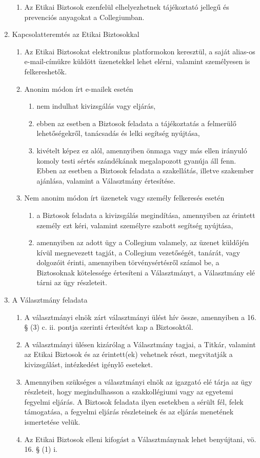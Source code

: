 \documentclass{../styles/rulebook}
\begin{document}
\begin{enumerate}
\begin{enumerate}
		\item Az Etikai Biztosok ezenfelül elhelyezhetnek tájékoztató jellegű és prevenciós anyagokat a Collegiumban.
	\end{enumerate}
	\item Kapcsolatteremtés az Etikai Biztosokkal
	\begin{enumerate}
		\item Az Etikai Biztosokat elektronikus platformokon keresztül, a saját alias-os e-mail-címükre küldött üzenetekkel lehet elérni, valamint személyesen is felkereshetők.
		\item Anonim módon írt e-mailek esetén
		\begin{enumerate}
			\item nem indulhat kivizsgálás vagy eljárás,
			\item ebben az esetben a Biztosok feladata a tájékoztatás a felmerülő lehetőségekről, tanácsadás és lelki segítség nyújtása,
			\item kivételt képez ez alól, amennyiben önmaga vagy más ellen irányuló komoly testi sértés szándékának megalapozott gyanúja áll fenn. Ebben az esetben a Biztosok feladata a szakellátás, illetve szakember ajánlása, valamint a Választmány értesítése.
		\end{enumerate}
		\item Nem anonim módon írt üzenetek vagy személy felkeresés esetén
		\begin{enumerate}
			\item a Biztosok feladata a kivizsgálás megindítása, amennyiben az érintett személy ezt kéri, valamint személyre szabott segítség nyújtása, 
			\item amennyiben az adott ügy a Collegium valamely, az üzenet küldőjén kívül megnevezett tagját, a Collegium vezetőségét, tanárát, vagy dolgozóit érinti, amennyiben törvénysértésről számol be, a Biztosoknak kötelessége értesíteni a Választmányt, a Választmány elé tárni az ügy részleteit.
		\end{enumerate}
	\end{enumerate}
	\item A Választmány feladata
	\begin{enumerate}
		\item A választmányi elnök zárt választmányi ülést hív össze, amennyiben a 16. § (3) c. ii. pontja szerinti értesítést kap a Biztosoktól. 
		\item A választmányi ülésen kizárólag a Választmány tagjai, a Titkár, valamint az Etikai Biztosok és az érintett(ek) vehetnek részt, megvitatják a kivizsgálást, intézkedést igénylő eseteket. 
		\item Amennyiben szükséges a választmányi elnök az igazgató elé tárja az ügy részleteit, hogy megindulhasson a szakkollégiumi vagy az egyetemi fegyelmi eljárás. A Biztosok feladata ilyen esetekben a sérült fél, felek támogatása, a fegyelmi eljárás részleteinek és az eljárás menetének ismertetése velük. 
		\item Az Etikai Biztosok elleni kifogást a Választmánynak lehet benyújtani, vö. 16. § (1) i.
	\end{enumerate}
\end{enumerate}
\end{document}
